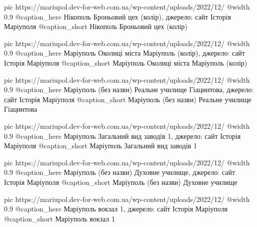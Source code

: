 	pic https://mariupol.dev-for-web.com.ua/wp-content/uploads/2022/12/%
	@width 0.9
	@caption_here Нікополь Броньовий цех (колір), джерело: сайт Історія Маріуполя
	@caption_short Нікополь Броньовий цех (колір)

	pic https://mariupol.dev-for-web.com.ua/wp-content/uploads/2022/12/%
	@width 0.9
	@caption_here Маріуполь Околиці міста Маріуполь (колір), джерело: сайт Історія Маріуполя
	@caption_short Маріуполь Околиці міста Маріуполь (колір)

	pic https://mariupol.dev-for-web.com.ua/wp-content/uploads/2022/12/%
	@width 0.9
	@caption_here Маріуполь (без назви) Реальне училище Гіацинтова, джерело: сайт Історія Маріуполя
	@caption_short Маріуполь (без назви) Реальне училище Гіацинтова

	pic https://mariupol.dev-for-web.com.ua/wp-content/uploads/2022/12/%
	@width 0.9
	@caption_here Маріуполь Загальний вид заводів 1, джерело: сайт Історія Маріуполя
	@caption_short Маріуполь Загальний вид заводів 1

	pic https://mariupol.dev-for-web.com.ua/wp-content/uploads/2022/12/%
	@width 0.9
	@caption_here Маріуполь (без назви) Духовне училище, джерело: сайт Історія Маріуполя
	@caption_short Маріуполь (без назви) Духовне училище

	pic https://mariupol.dev-for-web.com.ua/wp-content/uploads/2022/12/%
	@width 0.9
	@caption_here Маріуполь вокзал 1, джерело: сайт Історія Маріуполя
	@caption_short Маріуполь вокзал 1

